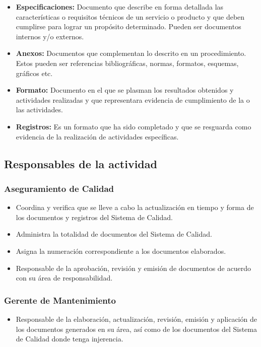 \begin{itemize}
	\item \textbf{Especificaciones:} Documento que describe en forma detallada las características o requisitos técnicos de un servicio o producto y que deben cumplirse para lograr un propósito determinado. Pueden ser documentos internos y/o externos.
	\item \textbf{Anexos:} Documentos que complementan lo descrito en un procedimiento. Estos pueden ser referencias bibliográficas, normas, formatos, esquemas, gráficos etc.
	\item \textbf{Formato:} Documento en el que se plasman los resultados obtenidos y actividades realizadas y que representara evidencia de cumplimiento de la o las actividades.
	\item \textbf{Registros:} Es un formato que ha sido completado y que se resguarda como evidencia de la realización de actividades específicas.
\end{itemize}

\subsection{Responsables de la actividad}

\subsubsection{Aseguramiento de Calidad}

\begin{itemize}
	\item Coordina y verifica que se lleve a cabo la actualización en tiempo y forma de los documentos y registros del Sistema de Calidad.
	\item Administra la totalidad de documentos del Sistema de Calidad.
	\item Asigna la numeración correspondiente a los documentos elaborados.
	\item Responsable de la aprobación, revisión y emisión de documentos de acuerdo con su área de responsabilidad.
\end{itemize}

\subsubsection{Gerente de Mantenimiento}

\begin{itemize}
	\item Responsable de la elaboración, actualización, revisión, emisión y aplicación de los documentos generados en su área, así como de los documentos del Sistema de Calidad donde tenga injerencia.
\end{itemize}

